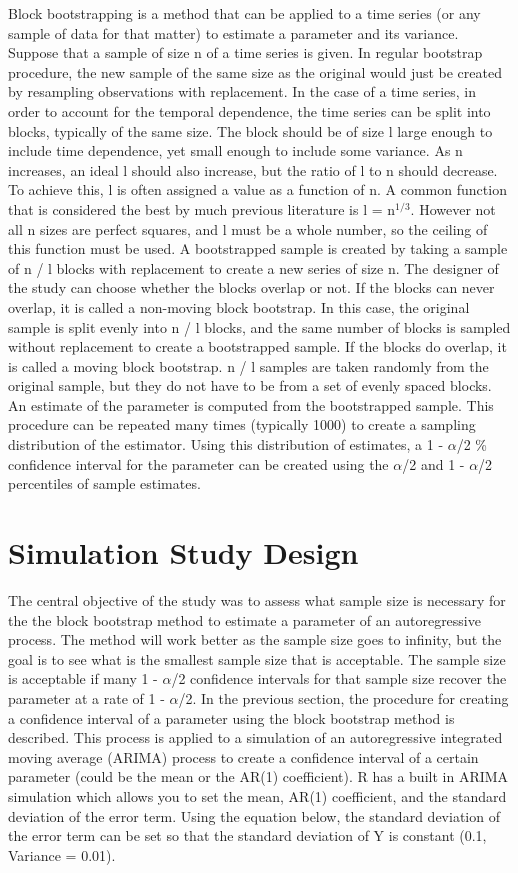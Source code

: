 \documentclass[12pt, letterpaper, titlepage]{article}
\begin{document}
Block bootstrapping is a method that can be applied to a time series (or any sample of data for that matter) to estimate a parameter and its variance. Suppose that a sample of size n of a time series is given. In regular bootstrap procedure, the new sample of the same size as the original would just be created by resampling observations with replacement. In the case of a time series, in order to account for the temporal dependence, the time series can be split into blocks, typically of the same size. The block should be of size l large enough to include time dependence, yet small enough to include some variance. As n increases, an ideal l should also increase, but the ratio of l to n should decrease. To achieve this, l is often assigned a value as a function of n. A common function that is considered the best by much previous literature is l = n$^{1/3}$. However not all n sizes are perfect squares, and l must be a whole number, so the ceiling of this function must be used. A bootstrapped sample is created by taking a sample of n / l blocks with replacement to create a new series of size n. The designer of the study can choose whether the blocks overlap or not. If the blocks can never overlap, it is called a non-moving block bootstrap. In this case, the original sample is split evenly into n / l blocks, and the same number of blocks is sampled without replacement to create a bootstrapped sample. If the blocks do overlap, it is called a moving block bootstrap. n / l samples are taken randomly from the original sample, but they do not have to be from a set of evenly spaced blocks. An estimate of the parameter is computed from the bootstrapped sample. This procedure can be repeated many times (typically 1000) to create a sampling distribution of the estimator. Using this distribution of estimates, a 1 - $\alpha$/2 \% confidence interval for the parameter can be created using the $\alpha$/2 and 1 - $\alpha$/2 percentiles of sample estimates.

\section{Simulation Study Design}
\label{sec:simdesign}

The central objective of the study was to assess what sample size is necessary for the the block bootstrap method to estimate a parameter of an autoregressive process. The method will work better as the sample size goes to infinity, but the goal is to see what is the smallest sample size that is acceptable. The sample size is acceptable if many 1 - $\alpha$/2 confidence intervals for that sample size recover the parameter at a rate of 1 - $\alpha$/2. In the previous section, the procedure for creating a confidence interval of a parameter using the block bootstrap method is described. This process is applied to a simulation of an autoregressive integrated moving average (ARIMA) process to create a confidence interval of a certain parameter (could be the mean or the AR(1) coefficient). R has a built in ARIMA simulation which allows you to set the mean, AR(1) coefficient, and the standard deviation of the error term. Using the equation below, the standard deviation of the error term can be set so that the standard deviation of Y is constant (0.1, Variance = 0.01). 
\end{document}
